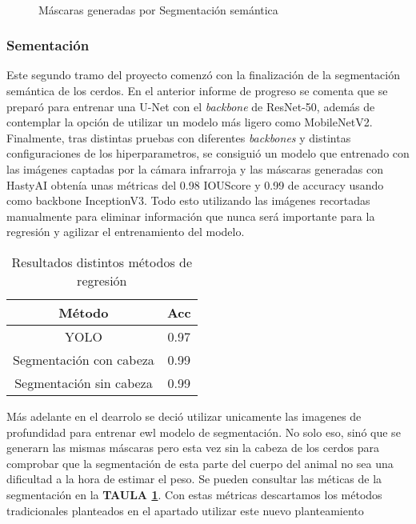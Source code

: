 \documentclass[12pt,a4paper]{article}
\begin{document}
\begin{figure}
 \centering
 \
 \caption{Máscaras generadas por Segmentación semántica}%
 \label{masks}%
\end{figure}
\subsubsection{Sementación}
Este segundo tramo del proyecto comenzó con la finalización de la segmentación semántica de los cerdos. En el anterior informe de progreso se comenta que se preparó para entrenar una U-Net\cite{unet} con el \textit{backbone} de ResNet-50\cite{resnet}, además de contemplar la opción de utilizar un modelo más ligero como MobileNetV2\cite{mobilenet}.
Finalmente, tras distintas pruebas con diferentes \textit{backbones} y distintas configuraciones de los hiperparametros, se consiguió un modelo que entrenado con las imágenes captadas por la cámara infrarroja y las máscaras generadas con HastyAI\cite{hasty} obtenía unas métricas del 0.98 IOUScore\cite{iou} y 0.99 de accuracy usando como backbone InceptionV3\cite{inception}. Todo esto utilizando las imágenes recortadas manualmente para eliminar información que nunca será importante para la regresión y agilizar el entrenamiento del modelo.
\begin{table}
 \centering
\begin{tabular}{|c|c|}
\hline
\textbf{Método}          & \textbf{Acc} \\ \hline
YOLO             & 0.97          \\
Segmentación con cabeza  & 0.99          \\
Segmentación sin cabeza  & 0.99          \\ \hline
\end{tabular}
\caption{Resultados distintos métodos de regresión}
\label{resultadosSeg}
\end{table}
Más adelante en el dearrolo se deció utilizar unicamente las imagenes de profundidad para entrenar ewl modelo de segmentación. No solo eso, sinó que se generarn las mismas máscaras pero esta vez sin la cabeza de los cerdos para comprobar que la segmentación de esta parte del cuerpo del animal no sea una dificultad a la hora de estimar el peso. Se pueden consultar las méticas de la segmentación en la \textbf{TAULA \ref{resultadosSeg}}. Con estas métricas descartamos los métodos tradicionales planteados en el apartado utilizar este nuevo planteamiento
\end{document}
